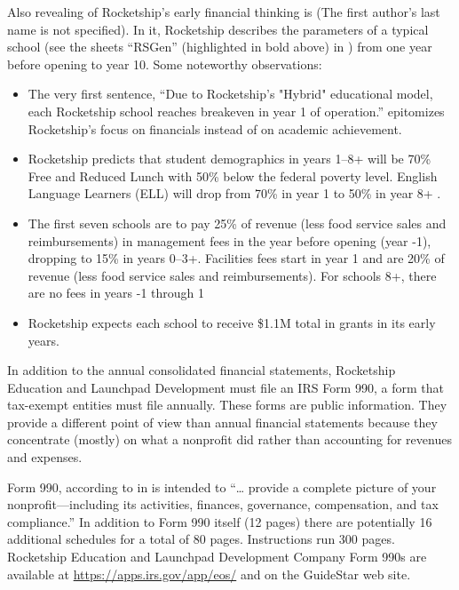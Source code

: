 Also revealing of Rocketship's early financial thinking is  \parencite{FinNarr2010} (The first author's last name is not specified). In it, Rocketship describes the parameters of a typical school (see the sheets ``RSGen'' (highlighted in bold above) in \textcite{RSED2009a}) from one year before opening to year 10. Some noteworthy observations:
\begin{itemize}
  \item The very first sentence, ``Due to Rocketship's "Hybrid" educational model, each Rocketship school reaches breakeven in year 1 of operation.'' \parencite[1]{FinNarr2010} epitomizes Rocketship's focus on financials instead of on academic achievement.
  \item Rocketship predicts that student demographics in years 1–8+ will be 70\% Free and Reduced Lunch with 50\% below the federal poverty level. English Language Learners (ELL) will drop from 70\% in year 1 to 50\% in year 8+ \parencite[1]{FinNarr2010}.
  \item The first seven schools are to pay 25\% of revenue (less food service sales and reimbursements) in management fees in the year before opening (year -1), dropping to 15\% in years 0–3+. Facilities fees start in year 1 and are 20\% of revenue (less food service sales and reimbursements). For schools 8+, there are no fees in years -1 through 1

  \item Rocketship expects each school to receive \$1.1M total in grants in its early years.
\end{itemize}

In addition to the annual consolidated financial statements, Rocketship Education and Launchpad Development must file an IRS Form 990, a form that tax-exempt entities must file annually. These forms are public information. They provide a different point of view than annual financial statements because they concentrate (mostly) on what a nonprofit did rather than accounting for revenues and expenses.

Form 990, according to  in  is intended to ``\ldots{} provide a complete picture of your nonprofit—including its activities, finances, governance, compensation, and tax compliance.'' \parencite[84]{Fishman2022} In addition to Form 990 itself (12 pages) there are potentially 16 additional schedules for a total of 80 pages. Instructions run 300 pages. Rocketship Education and Launchpad Development Company Form 990s are available at \url{https://apps.irs.gov/app/eos/} and on the GuideStar web site.

